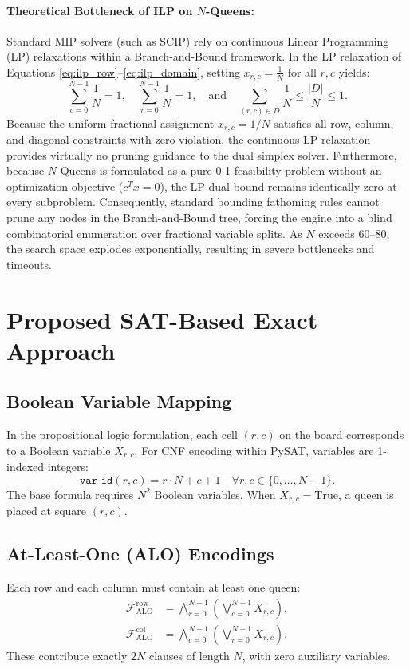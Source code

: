 \documentclass[a4paper,fleqn]{cas-sc}
\begin{document}
\paragraph{Theoretical Bottleneck of ILP on $N$-Queens:}
Standard MIP solvers (such as SCIP) rely on continuous Linear Programming (LP) relaxations within a Branch-and-Bound framework. In the LP relaxation of Equations \eqref{eq:ilp_row}--\eqref{eq:ilp_domain}, setting $x_{r, c} = \frac{1}{N}$ for all $r, c$ yields:
\begin{equation}
    \sum_{c=0}^{N-1} \frac{1}{N} = 1, \quad \sum_{r=0}^{N-1} \frac{1}{N} = 1, \quad \text{and} \quad \sum_{(r, c) \in D} \frac{1}{N} \le \frac{|D|}{N} \le 1.
\end{equation}
Because the uniform fractional assignment $x_{r, c} = 1/N$ satisfies all row, column, and diagonal constraints with zero violation, the continuous LP relaxation provides virtually no pruning guidance to the dual simplex solver. Furthermore, because $N$-Queens is formulated as a pure 0-1 feasibility problem without an optimization objective ($c^T x = 0$), the LP dual bound remains identically zero at every subproblem. Consequently, standard bounding fathoming rules cannot prune any nodes in the Branch-and-Bound tree, forcing the engine into a blind combinatorial enumeration over fractional variable splits. As $N$ exceeds 60--80, the search space explodes exponentially, resulting in severe bottlenecks and timeouts.

\section{Proposed SAT-Based Exact Approach}
\label{sec:sat}

\subsection{Boolean Variable Mapping}
In the propositional logic formulation, each cell $(r, c)$ on the board corresponds to a Boolean variable $X_{r, c}$. For CNF encoding within PySAT, variables are 1-indexed integers:
\begin{equation}
    \mathtt{var\_id}(r, c) = r \cdot N + c + 1 \quad \forall r, c \in \{0, \dots, N-1\}.
\end{equation}
The base formula requires $N^2$ Boolean variables. When $X_{r, c} = \text{True}$, a queen is placed at square $(r, c)$.

\subsection{At-Least-One (ALO) Encodings}
Each row and each column must contain at least one queen:
\begin{align}
    \mathcal{F}_{\text{ALO}}^{\text{row}} &= \bigwedge_{r=0}^{N-1} \left( \bigvee_{c=0}^{N-1} X_{r, c} \right), \label{eq:sat_alo_row} \\
    \mathcal{F}_{\text{ALO}}^{\text{col}} &= \bigwedge_{c=0}^{N-1} \left( \bigvee_{r=0}^{N-1} X_{r, c} \right). \label{eq:sat_alo_col}
\end{align}
These contribute exactly $2N$ clauses of length $N$, with zero auxiliary variables.
\end{document}
